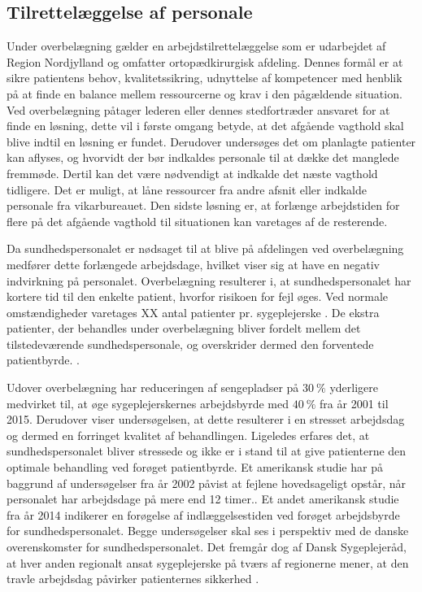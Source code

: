 \subsection{Tilrettelæggelse af personale}
Under overbelægning gælder en arbejdstilrettelæggelse som er udarbejdet af Region Nordjylland og omfatter ortopædkirurgisk afdeling. Dennes formål er at sikre patientens behov, kvalitetssikring, udnyttelse af kompetencer med henblik på at finde en balance mellem ressourcerne og krav i den pågældende situation. Ved overbelægning påtager lederen eller dennes stedfortræder ansvaret for at finde en løsning, dette vil i første omgang betyde, at det afgående vagthold skal blive indtil en løsning er fundet. Derudover undersøges det om planlagte patienter kan aflyses, og hvorvidt der bør indkaldes personale til at dække det manglede fremmøde. Dertil kan det være nødvendigt at indkalde det næste vagthold tidligere. Det er muligt, at låne ressourcer fra andre afsnit eller indkalde personale fra vikarbureauet. Den sidste løsning er, at forlænge arbejdstiden for flere på det afgående vagthold til situationen kan varetages af de resterende. \cite{Bjerg2016}

\noindent 
Da sundhedspersonalet er nødsaget til at blive på afdelingen ved overbelægning medfører dette forlængede arbejdsdage, hvilket viser sig at have en negativ indvirkning på personalet.\cite{Kjeldsen2015} \cite{Dinges2004} Overbelægning resulterer i, at sundhedspersonalet har kortere tid til den enkelte patient, hvorfor risikoen for fejl øges. \cite{Dinges2004} Ved normale omstændigheder varetages XX antal patienter pr. sygeplejerske . De ekstra patienter, der behandles under overbelægning bliver fordelt mellem det tilstedeværende sundhedspersonale, og overskrider dermed den forventede patientbyrde. . 


\noindent
Udover overbelægning har reduceringen af sengepladser på $30~\%$ yderligere medvirket til, at øge sygeplejerskernes arbejdsbyrde med $40~\%$ fra år 2001 til 2015. Derudover viser undersøgelsen, at dette resulterer i en stresset arbejdsdag og dermed en forringet kvalitet af behandlingen.\cite{Kjeldsen2015} Ligeledes erfares det, at sundhedspersonalet bliver stressede og ikke er i stand til at give patienterne den optimale behandling ved forøget patientbyrde. \cite{Aiken2002} Et amerikansk studie har på baggrund af undersøgelser fra år 2002 påvist at fejlene hovedsageligt opstår, når personalet har arbejdsdage på mere end 12 timer.\cite{Dinges2004}. Et andet amerikansk studie fra år 2014 indikerer en forøgelse af indlæggelsestiden ved forøget arbejdsbyrde for sundhedspersonalet\cite{Elliott2014}. Begge undersøgelser skal ses i perspektiv med de danske overenskomster for sundhedspersonalet. Det fremgår dog af Dansk Sygeplejeråd, at hver anden regionalt ansat sygeplejerske på tværs af regionerne mener, at den travle arbejdsdag påvirker patienternes sikkerhed \cite{Kjeldsen2015}. 


